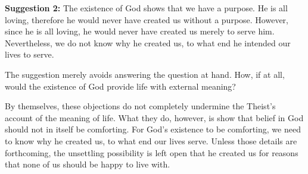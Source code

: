 \documentclass[]{article}
\begin{document}
\textbf{Suggestion 2:} The existence of God shows that we have a
purpose. He is all loving, therefore he would never have created us
without a purpose. However, since he is all loving, he would never have
created us merely to serve him. Nevertheless, we do not know why he
created us, to what end he intended our lives to serve.

The suggestion merely avoids answering the question at hand. How, if at
all, would the existence of God provide life with external meaning?

By themselves, these objections do not completely undermine the Theist's
account of the meaning of life. What they do, however, is show that
belief in God should not in itself be comforting. For God's existence to
be comforting, we need to know why he created us, to what end our lives
serve. Unless those details are forthcoming, the unsettling possibility
is left open that he created us for reasons that none of us should be
happy to live with.
\end{document}
